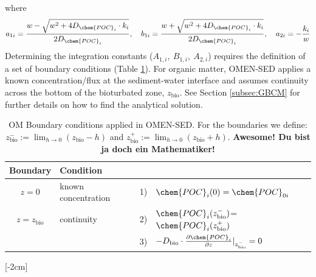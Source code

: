 \documentclass[gmd, manuscript]{copernicus}
\begin{document}
where
\begin{equation} 
 a_{1i} = \frac{w - \sqrt{w^2+4D_{\chem{POC}_i}\cdot k_i}}{2D_{\chem{POC}_i}}, \quad b_{1i} = \frac{w + \sqrt{w^2+4D_{\chem{POC}_i}\cdot k_i}}{2D_{\chem{POC}_i}}, \quad a_{2i} = -\frac{k_i}{w}
\end{equation}
Determining the integration constants ($A_{1,i},\ B_{1,i},\ A_{2,i}$) requires the definition of a set of boundary conditions (Table \ref{Tab:BC_OM}). 
For organic matter, OMEN-SED applies a known concentration/flux at the sediment-water interface and assumes continuity across the bottom of the bioturbated zone, $z_{\mathrm{bio}}$. 
See Section \ref{subsec:GBCM} for further details on how to find the analytical solution.

\begin{table}[tbp]
\caption{OM Boundary conditions applied in OMEN-SED. For the boundaries we define:  $z_{\mathrm{bio}}^- := \lim_{h\to0} (z_{\mathrm{bio}}-h)$ and $z_{\mathrm{bio}}^+ := \lim_{h\to0} (z_{\mathrm{bio}}+h)$. \textbf{Awesome! Du bist ja doch ein Mathematiker!}}
\centering
\begin{tabular}{ |c| l| c l|}
\hline
\textbf{Boundary}& \textbf{Condition}& &\\
\hline
$z=0$& known concentration& 1)& $\chem{POC}_i(0)=\chem{POC}_{0i}$\\
$z=z_{\mathrm{bio}}$&continuity& 2)& $\chem{POC}_i(z_{\mathrm{bio}}^-)$=$\chem{POC}_i(z_{\mathrm{bio}}^+)$\\
               &&3)&$-D_{\mathrm{bio}}\cdot \frac{\partial \chem{POC}_i}{\partial z}|_{z_{\mathrm{bio}}^-}=0$\\
\hline
\end{tabular}
\label{Tab:BC_OM}
[-2cm]%
\end{table}
\end{document}
